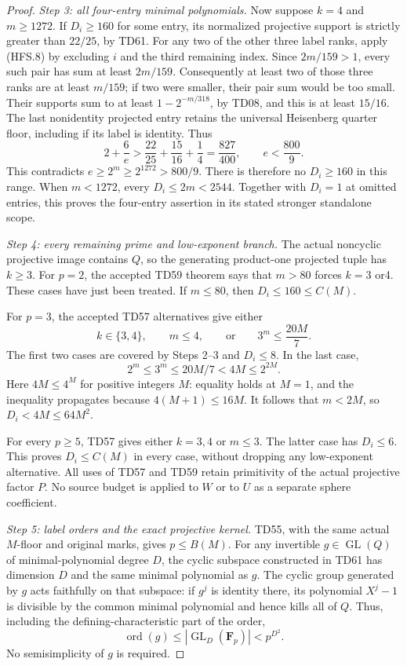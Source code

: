 \begin{proof}
\emph{Step 3: all four-entry minimal polynomials.}
Now suppose \(k=4\) and \(m\ge1272\).
If \(D_i\ge160\) for some entry, its normalized projective support
is strictly greater than \(22/25\), by TD61.
For any two of the other three label ranks, apply (HFS.8)
by excluding \(i\) and the third remaining index.
Since \(2m/159>1\), every such pair has sum at least \(2m/159\).
Consequently at least two of those three ranks are at least
\(m/159\); if two were smaller, their pair sum would be too small.
Their supports sum to at least \(1-2^{-m/318}\), by TD08,
and this is at least \(15/16\).
The last nonidentity projected entry retains the universal
Heisenberg quarter floor, including if its label is identity.
Thus
\[
 2+\frac6e
   >\frac{22}{25}+\frac{15}{16}+\frac14
    =\frac{827}{400},
       \qquad e<\frac{800}{9}.
 \tag{HFS.12}
\]
This contradicts \(e\ge2^m\ge2^{1272}>800/9\).
There is therefore no \(D_i\ge160\) in this range.
When \(m<1272\), every \(D_i\le2m<2544\).
Together with \(D_i=1\) at omitted entries, this proves the
four-entry assertion in its stated stronger standalone scope.

\emph{Step 4: every remaining prime and low-exponent branch.}
The actual noncyclic projective image contains \(Q\), so the
generating product-one projected tuple has \(k\ge3\).
For \(p=2\), the accepted TD59 theorem says that \(m>80\)
forces \(k=3\) or4.  These cases have just been treated.
If \(m\le80\), then \(D_i\le160\le C(M)\).

For \(p=3\), the accepted TD57 alternatives give either
\[
      k\in\{3,4\},\qquad
      m\le4,\qquad\text{or}\qquad
                   3^m\le\frac{20M}{7}.
 \tag{HFS.13}
\]
The first two cases are covered by Steps 2--3 and \(D_i\le8\).
In the last case,
\[
        2^m\le3^m\le20M/7<4M\le2^{2M}.
 \tag{HFS.14}
\]
Here \(4M\le4^M\) for positive integers \(M\): equality holds
at \(M=1\), and the inequality propagates because
\(4(M+1)\le16M\).
It follows that \(m<2M\), so \(D_i<4M\le64M^2\).

For every \(p\ge5\), TD57 gives either \(k=3,4\) or \(m\le3\).
The latter case has \(D_i\le6\).
This proves \(D_i\le C(M)\) in every case, without dropping
any low-exponent alternative.
All uses of TD57 and TD59 retain primitivity of the actual
projective factor \(P\).  No source budget is applied to \(W\)
or to \(U\) as a separate sphere coefficient.

\emph{Step 5: label orders and the exact projective kernel.}
TD55, with the same actual \(M\)-floor and original marks, gives
\(p\le B(M)\).
For any invertible \(g\in\operatorname{GL}(Q)\) of minimal-polynomial
degree \(D\), the cyclic subspace constructed in TD61 has dimension
\(D\) and the same minimal polynomial as \(g\).
The cyclic group generated by \(g\) acts faithfully on that subspace:
if \(g^j\) is identity there, its polynomial \(X^j-1\) is divisible
by the common minimal polynomial and hence kills all of \(Q\).
Thus, including the defining-characteristic part of the order,
\[
  \operatorname{ord}(g)\le|\operatorname{GL}_D(\mathbf F_p)|
                  <p^{D^2}.
 \tag{HFS.15}
\]
No semisimplicity of \(g\) is required.


\end{proof}
